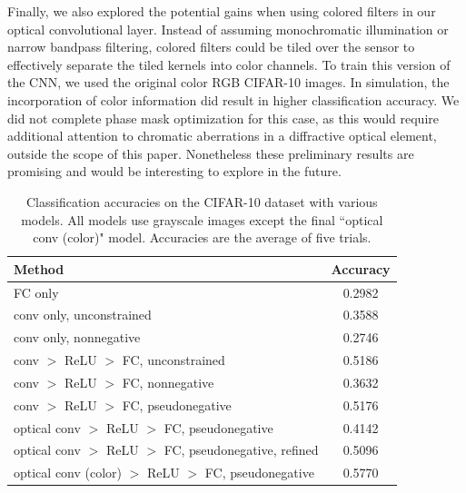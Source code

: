 \documentclass[fleqn,10pt]{wlscirep}
\begin{document}
Finally, we also explored the potential gains when using colored filters in our optical convolutional layer. Instead of assuming monochromatic illumination or narrow bandpass filtering, colored filters could be tiled over the sensor to effectively separate the tiled kernels into color channels. To train this version of the CNN, we used the original color RGB CIFAR-10 images. In simulation, the incorporation of color information did result in higher classification accuracy. We did not complete phase mask optimization for this case, as this would require additional attention to chromatic aberrations in a diffractive optical element, outside the scope of this paper. Nonetheless these preliminary results are promising and would be interesting to explore in the future.

\setlength{\tabcolsep}{4pt}
\begin{table}
\begin{center}
\caption{Classification accuracies on the CIFAR-10 dataset with various models. All models use grayscale images except the final ``optical conv (color)" model. Accuracies are the average of five trials.}
\label{table:hybrid}
\begin{tabular}{ l | c } 
 \textbf{Method} &  \textbf{Accuracy} \\ \hline \hline
FC only				& 0.2982	\\
conv only, unconstrained				& 0.3588	\\
conv only, nonnegative				& 0.2746	\\
conv $>$ ReLU $>$ FC, unconstrained 	& 0.5186	\\
conv $>$ ReLU $>$ FC, nonnegative	 & 0.3632	 \\
conv $>$ ReLU $>$ FC, pseudonegative & 0.5176	\\
optical conv $>$ ReLU $>$ FC, pseudonegative & 0.4142	\\
optical conv $>$ ReLU $>$ FC, pseudonegative, refined 	& 0.5096 \\ 
optical conv (color) $>$ ReLU $>$ FC, pseudonegative & 0.5770 \\
\end{tabular}
\end{center}
\end{table}
\setlength{\tabcolsep}{1.4pt}
\end{document}
